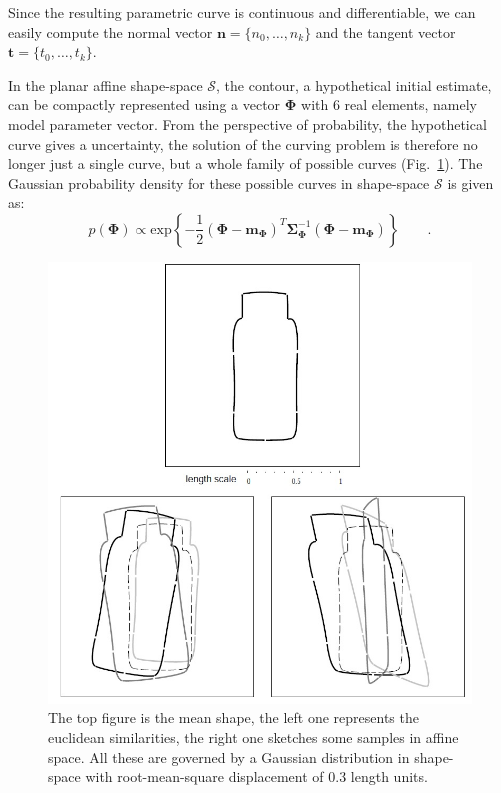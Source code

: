 \documentclass[conference]{IEEEtran}
\begin{document}
Since the resulting parametric curve is continuous and
differentiable, we can easily compute the normal vector $\mathbf{n} = \{n_0, \ldots,
n_{k}\}$ and the tangent vector $\mathbf{t} = \{t_0, \ldots, t_{k}\}$.

In the planar affine shape-space $\mathcal{S}$, the contour, a
hypothetical initial estimate, can be compactly represented using a
vector $\mathbf{\Phi}$ with 6 real elements, namely model
parameter vector. From the perspective of probability, the hypothetical
curve gives a uncertainty, the solution of the curving problem is
therefore no longer just a single curve, but a whole family of
possible curves (Fig.~\ref{fig:transform}). The Gaussian probability density for these possible
curves in shape-space $\mathcal{S}$ is given as:
\begin{equation}
  \label{eq:prior}
   p(\mathbf{\Phi}) \propto
\mathrm{exp} \left\{ -\frac{1}{2} (\mathbf{\Phi} -
  \mathbf{m}_{\mathbf{\Phi}})^T \mathbf{\Sigma}_{\mathbf{\Phi}}^{-1} (\mathbf{\Phi} -
  \mathbf{m}_{\mathbf{\Phi}}) \right\}\qquad.
\end{equation}
\begin{figure}[htb]
  \centering
  \includegraphics[width=\columnwidth]{images/prior.jpg}
\caption{The top
  figure is the mean shape, the left one represents the euclidean
  similarities, the right one
  sketches some samples in affine space. All these are governed by a
  Gaussian distribution in shape-space with root-mean-square
  displacement of 0.3 length units.}
\label{fig:transform}
\end{figure}
\end{document}

